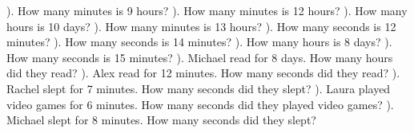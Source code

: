 \documentclass{article}%
\begin{document}
). How many minutes is 9 hours?%
\newline%
\newline%
). How many minutes is 12 hours?%
\newline%
\newline%
). How many hours is 10 days?%
\newline%
\newline%
). How many minutes is 13 hours?%
\newline%
\newline%
). How many seconds is 12 minutes?%
\newline%
\newline%
). How many seconds is 14 minutes?%
\newline%
\newline%
). How many hours is 8 days?%
\newline%
\newline%
). How many seconds is 15 minutes?%
\newline%
\newline%
). Michael read for 8 days. How many hours did they read?%
\newline%
\newline%
). Alex read for 12 minutes. How many seconds did they read?%
\newline%
\newline%
). Rachel slept for 7 minutes. How many seconds did they slept?%
\newline%
\newline%
). Laura played video games for 6 minutes. How many seconds did they played video games?%
\newline%
\newline%
). Michael slept for 8 minutes. How many seconds did they slept?%
\newline%
\newline%
\newline%
\end{document}
